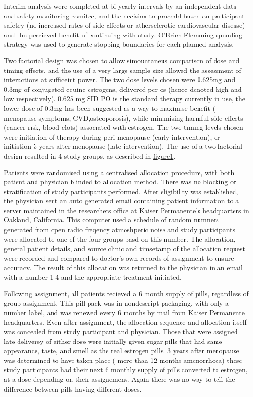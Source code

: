 \documentclass[11pt]{article}
\begin{document}
		Interim analysis were completed at bi-yearly intervals by an independent data and safety monitoring comitee, and the decision to procedd based on participant safetey (no increased rates of side effects or athersclerotic cardiovascular disease) and the percieved benefit of continuing with study.
		O’Brien-Flemming spending strategy was used to generate stopping boundaries for each planned analysis.


		Two factorial design was chosen to allow simountaneus comparison of dose and timing effects, and the use of a very large sample size allowed the assessment of interactions at sufficeint power. 
		The two dose levels chosen were 0.625mg and 0.3mg of conjugated equine estrogens, delivered per os (hence denoted high and low respectively).
		0.625 mg SID PO is the standard therapy currently in use, the lower dose of 0.3mg has been suggested as a way to maximise benefit ( menopause symptoms, CVD,osteoporosis), while minimising harmful side effects (cancer risk, blood clots)  associated with estrogen.
		The two timing levels chosen were initiation of therapy during peri menopause (early intervention), or initiation 3 years after menopause (late intervention).
		The use of a two factorial design resulted in 4 study groups, as described in \hyperref[Figure 1]{figure1}.


		Patients were randomised using a centralised allocation procedure, with both patient and physician blinded to allocation method. 
		There was no blocking or stratification of study participants performed.
		After eligibility was established, the physician sent an auto generated email containing patient information to a server maintained in the researchers office at Kaiser Permanente's headquarters in Oakland, California. 
		This computer used a schedule of random numners generated from open radio freqency atmoshperic noise \cite{Eddelbuettel2009}  and study participants were allocated to one of the four groups basd on this number.
		The allocation, general patient details, and source clinic and timsetamp of the allocation request were recorded and compared to doctor's own records of assignment to ensure accuracy.
		The result of this allocation was returned to the physician in an email with a number 1-4 and the appropriate treatment initiated.


		Following assignment, all patients recieved a 6 month supply of pills, regardless of group assignment.
		This pill pack was in nondescript packaging, with only a number label, and was renewed every 6 months by mail from Kaiser Permanente headquarters.
		Even after assignment, the allocation sequence and allocation itself was concealed from study participant and physician.
		Those that were assigned late deliverey of either dose were initially given sugar pills that had same appearance, taste, and smell as the real estrogen pills. 
		3 years after menopause was determined to have taken place ( more than 12 months amenorrhoea) these study participants had their next 6 monthly supply of pills converted to estrogen, at a dose depending on their assignement. Again there was no way to tell the difference between pills having different doses.
\end{document}
